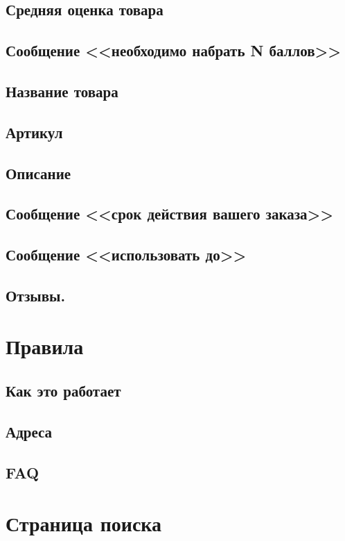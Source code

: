         \subsection{Средняя оценка товара}
        \subsection{Сообщение <<необходимо набрать N баллов>>}
        \subsection{Название товара}
        \subsection{Артикул}
        \subsection{Описание}
        \subsection{Сообщение <<срок действия вашего заказа>>}
        \subsection{Сообщение <<использовать до>>}
        \subsection{Отзывы.}

    \section{Правила}
        \subsection{Как это работает}
            \label{sec:rules_hiw}
        \subsection{Адреса}
        \subsection{FAQ}
            \label{sec:page_faq}

    \section{Страница поиска}
        \label{search_page}

